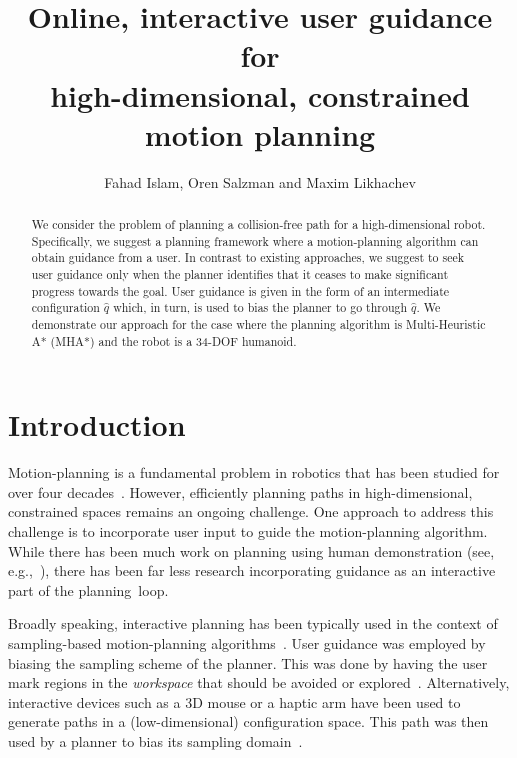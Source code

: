 \documentclass[conference]{IEEEtran}
\begin{document}
\title{	Online, interactive user guidance for \\
		high-dimensional, constrained motion planning }

\author{Fahad Islam, Oren Salzman and Maxim Likhachev}


\maketitle
\thispagestyle{empty}
\pagestyle{empty}



\begin{abstract}
We consider the problem of planning a collision-free path for a high-dimensional robot.
Specifically, we suggest a planning framework where a motion-planning algorithm can obtain guidance from a user.
In contrast to existing approaches, we suggest to seek user guidance only when the planner identifies that it ceases to make significant progress towards the goal.
User guidance is given in the form of an intermediate configuration $\hat{q}$ which, in turn, is used to bias the planner to go through $\hat{q}$.
We demonstrate our approach for the case where the planning algorithm is Multi-Heuristic A* (MHA*) and the robot is a 34-DOF humanoid.
\end{abstract}

\IEEEpeerreviewmaketitle

\section{Introduction}
\label{sec:intro}

Motion-planning is a fundamental problem in robotics that has been studied for over four decades~\cite{CBHKKLT05,L06,S04}.
However, efficiently planning paths in high-dimensional, constrained spaces remains an ongoing challenge.
One approach to address this challenge is to incorporate user input to guide the motion-planning algorithm.
While there has been much work on planning using human demonstration 
(see, e.g.,~\cite{ACVB09, HS16, PHCL16, SHLA16, YA17}), 
there has been far less research incorporating guidance as an interactive part of the planning~loop.

Broadly speaking, interactive planning has been typically used in the context of sampling-based motion-planning algorithms~\cite{L06}.
User guidance was employed by biasing the sampling scheme of the planner.
This was done by having the user mark regions in the \emph{workspace} that should be avoided or 
explored~\cite{DSJA14, MTMKDC15, YPB15}.
Alternatively, interactive devices such as a 3D mouse or a haptic arm have been used to generate paths in a (low-dimensional) configuration space. This path was then used by a planner to bias its 
sampling domain~\cite{BTFF16, FTF09, TFF12}.
\end{document}
